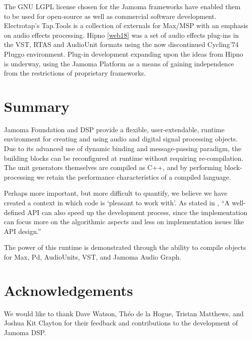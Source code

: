 \documentclass[twoside,10pt]{article}
\begin{document}
The GNU LGPL license chosen for the Jamoma frameworks have enabled them to be used for open-source as well as commercial software development.  Electrotap's Tap.Tools \cite{web17} is a collection of externals for Max/MSP with an emphasis on audio effects processing.  Hipno \ref{web18} was a set of audio effects plug-ins in the VST, RTAS and AudioUnit formats using the now discontinued Cycling'74 Pluggo environment.  Plug-in development expanding upon the ideas from Hipno is underway, using the Jamoma Platform as a means of gaining independence from the restrictions of proprietary frameworks.




\section{Summary} %

Jamoma Foundation and DSP provide a flexible, user-extendable, runtime environment for creating and using audio and digital signal processing objects.  Due to its advanced use of dynamic binding and message-passing paradigm, the building blocks can be reconfigured at runtime without requiring re-compilation.  The unit generators themselves are compiled as C++, and by performing block-processing we retain the performance characteristics of a compiled language.

Perhaps more important, but more difficult to quantify, we believe we have created a context in which code is `pleasant to work with'.  As stated in \cite{Lerch:2005}, ``A well-defined API can also speed up the development process, since the implementation can focus more on the algorithmic aspects and less on implementation issues like API design.'' 

The power of this runtime is demonstrated through the ability to compile objects for Max, Pd, AudioUnits, VST, and Jamoma Audio Graph.




\section{Acknowledgements} %

We would like to thank Dave Watson, Th\'eo de la Hogue, Tristan Matthews, and Joshua Kit Clayton for their feedback and contributions to the development of Jamoma DSP.
\end{document}
